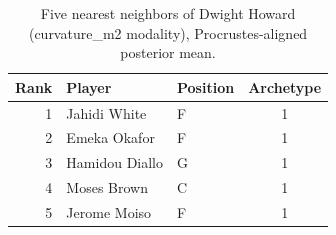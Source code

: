 \begin{table}[htbp]
  \centering\small
  \begin{tabular}{rllc}
    \toprule
    Rank & Player & Position & Archetype \\
    \midrule
    1 & Jahidi White & F & 1 \\
    2 & Emeka Okafor & F & 1 \\
    3 & Hamidou Diallo & G & 1 \\
    4 & Moses Brown & C & 1 \\
    5 & Jerome Moiso & F & 1 \\
    \bottomrule
  \end{tabular}
  \caption{Five nearest neighbors of Dwight Howard (curvature_m2 modality), Procrustes-aligned posterior mean.}
  \label{tab:Dwight_Howard_neighbors_curvature_m2}
\end{table}

